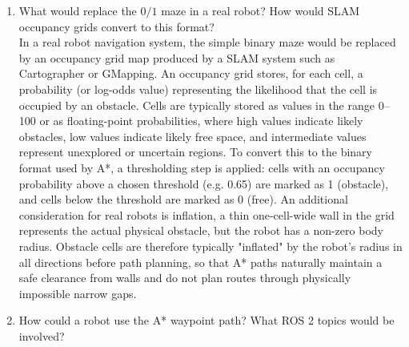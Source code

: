 \documentclass[11 pt , a 4 paper ]{article}
\theoremstyle{definition}
\begin{document}
\begin{enumerate}
     \newline \noindent If the goal is completely enclosed by obstacles or is otherwise unreachable from the start, A* will exhaust its open list and it will run out of nodes to expand before ever reaching the goal. In a correctly implemented A*, this is detectable by checking whether the open list becomes empty before the goal node is popped. The current code can be modified to handle this by adding a check after the main loop: if the loop exits because the open list is empty (rather than because the goal was found), the algorithm should return a failure signal rather than an empty or partial path. In Python this might look like returning \texttt{None} or an empty list with a printed message such as \texttt{"No valid path found from start to goal"}. This is particularly important in robotics because sending a robot on a navigation task with no reachable goal could cause it to spin indefinitely or enter an error state; detecting the unreachable case allows the higher-level planner to request a new goal or alert the operator. 
   \item What would replace the $0/1$ maze in a real robot? How would SLAM occupancy grids convert to this format?\\ 
     \newline \noindent In a real robot navigation system, the simple binary maze would be replaced by an occupancy grid map produced by a SLAM system such as Cartographer or GMapping. An occupancy grid stores, for each cell, a probability (or log-odds value) representing the likelihood that the cell is occupied by an obstacle. Cells are typically stored as values in the range 0–100 or as floating-point probabilities, where high values indicate likely obstacles, low values indicate likely free space, and intermediate values represent unexplored or uncertain regions. To convert this to the binary format used by A*, a thresholding step is applied: cells with an occupancy probability above a chosen threshold (e.g. 0.65) are marked as 1 (obstacle), and cells below the threshold are marked as 0 (free). An additional consideration for real robots is inflation, a thin one-cell-wide wall in the grid represents the actual physical obstacle, but the robot has a non-zero body radius. Obstacle cells are therefore typically "inflated" by the robot's radius in all directions before path planning, so that A* paths naturally maintain a safe clearance from walls and do not plan routes through physically impossible narrow gaps.
   \item How could a robot use the A* waypoint path? What ROS 2 topics would be involved?\\ 

\end{enumerate}
\end{document}
